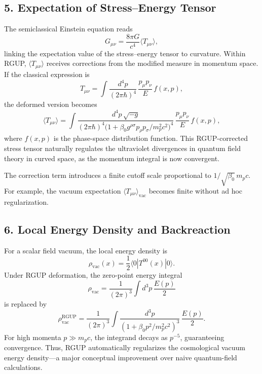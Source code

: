 \documentclass[11pt,oneside]{book}
\numberwithin{equation}{chapter}
\begin{document}
\subsection*{5. Expectation of Stress–Energy Tensor}

The semiclassical Einstein equation reads
\begin{equation}
G_{\mu\nu}
= \frac{8\pi G}{c^4}
\langle T_{\mu\nu} \rangle,
\end{equation}
linking the expectation value of the stress–energy tensor to curvature.  
Within RGUP, $\langle T_{\mu\nu}\rangle$ receives corrections from the modified measure in momentum space.  
If the classical expression is
\begin{equation}
T_{\mu\nu} = \int \frac{d^4p}{(2\pi\hbar)^4}\,
\frac{p_\mu p_\nu}{E}\,f(x,p),
\end{equation}
the deformed version becomes
\begin{equation}
\langle T_{\mu\nu} \rangle
= \int \frac{d^4p\,\sqrt{-g}}
{(2\pi\hbar)^4
\big(1+\beta_0 g^{\rho\sigma}p_\rho p_\sigma/m_p^2 c^2\big)^4}
\,\frac{p_\mu p_\nu}{E}\,f(x,p),
\end{equation}
where $f(x,p)$ is the phase-space distribution function.  
This RGUP-corrected stress tensor naturally regulates the ultraviolet divergences in quantum field theory in curved space, as the momentum integral is now convergent.

The correction term introduces a finite cutoff scale proportional to $1/\sqrt{\beta_0}\,m_p c$.  
For example, the vacuum expectation $\langle T_{\mu\nu}\rangle_{\text{vac}}$ becomes finite without ad hoc regularization.

\subsection*{6. Local Energy Density and Backreaction}

For a scalar field vacuum, the local energy density is
\begin{equation}
\rho_{\text{vac}}(x)
= \frac{1}{2}\langle 0 | T^{00}(x) | 0 \rangle.
\end{equation}
Under RGUP deformation, the zero-point energy integral
\begin{equation}
\rho_{\text{vac}} = \frac{1}{(2\pi)^3}\!\int\! d^3p\,\frac{E(p)}{2}
\end{equation}
is replaced by
\begin{equation}
\rho_{\text{vac}}^{\text{RGUP}}
= \frac{1}{(2\pi)^3}\!
\int\! \frac{d^3p}{(1+\beta_0 p^2/m_p^2 c^2)^3}\,
\frac{E(p)}{2}.
\end{equation}
For high momenta $p\gg m_p c$, the integrand decays as $p^{-5}$, guaranteeing convergence.  
Thus, RGUP automatically regularizes the cosmological vacuum energy density—a major conceptual improvement over naive quantum-field calculations.
\end{document}

